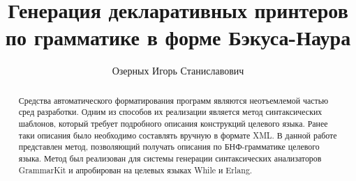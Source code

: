 \title{Генерация декларативных принтеров по грамматике в форме Бэкуса-Наура}


\author{Озерных Игорь Станиславович}



\maketitle             

\begin{abstract}
Средства автоматического форматирования программ
являются неотъемлемой частью сред разработки.
Одним из способов их реализации является метод
синтаксических шаблонов, который требует подробного
описания конструкций целевого языка. Ранее таки описания
было необходимо составлять вручную в формате XML. В данной работе
представлен метод, позволяющий получать описания по БНФ-грамматике
целевого языка. Метод был реализован для системы
генерации синтаксических анализаторов GrammarKit и апробирован
на целевых языках While и Erlang.
\end{abstract}









